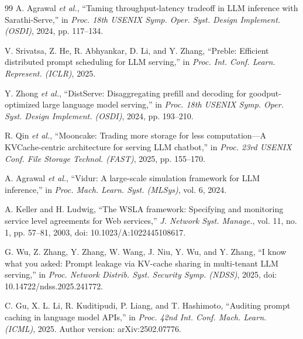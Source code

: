 \begin{thebibliography}{99}
A. Agrawal \emph{et al.}, ``Taming throughput-latency tradeoff in LLM inference with Sarathi-Serve,'' in \emph{Proc. 18th USENIX Symp. Oper. Syst. Design Implement. (OSDI)}, 2024, pp. 117--134.

V. Srivatsa, Z. He, R. Abhyankar, D. Li, and Y. Zhang, ``Preble: Efficient distributed prompt scheduling for LLM serving,'' in \emph{Proc. Int. Conf. Learn. Represent. (ICLR)}, 2025.

Y. Zhong \emph{et al.}, ``DistServe: Disaggregating prefill and decoding for goodput-optimized large language model serving,'' in \emph{Proc. 18th USENIX Symp. Oper. Syst. Design Implement. (OSDI)}, 2024, pp. 193--210.

R. Qin \emph{et al.}, ``Mooncake: Trading more storage for less computation---A KVCache-centric architecture for serving LLM chatbot,'' in \emph{Proc. 23rd USENIX Conf. File Storage Technol. (FAST)}, 2025, pp. 155--170.

A. Agrawal \emph{et al.}, ``Vidur: A large-scale simulation framework for LLM inference,'' in \emph{Proc. Mach. Learn. Syst. (MLSys)}, vol. 6, 2024.

A. Keller and H. Ludwig, ``The WSLA framework: Specifying and monitoring service level agreements for Web services,'' \emph{J. Network Syst. Manage.}, vol. 11, no. 1, pp. 57--81, 2003, doi: 10.1023/A:1022445108617.

G. Wu, Z. Zhang, Y. Zhang, W. Wang, J. Niu, Y. Wu, and Y. Zhang, ``I know what you asked: Prompt leakage via KV-cache sharing in multi-tenant LLM serving,'' in \emph{Proc. Network Distrib. Syst. Security Symp. (NDSS)}, 2025, doi: 10.14722/ndss.2025.241772.

C. Gu, X. L. Li, R. Kuditipudi, P. Liang, and T. Hashimoto, ``Auditing prompt caching in language model APIs,'' in \emph{Proc. 42nd Int. Conf. Mach. Learn. (ICML)}, 2025. Author version: arXiv:2502.07776.

\end{thebibliography}
